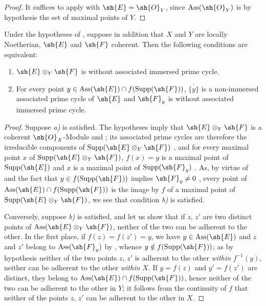 \begin{proof}
It suffices to apply  with $\sh{E}=\sh{O}_Y$, since $\operatorname{Ass}(\sh{O}_Y)$ is by hypothesis the set of maximal points of $Y$.
\end{proof}

\begin{corollary}[3.3.3]
\label{IV.3.3.3}
Under the hypotheses of , suppose in addition that $X$ and $Y$ are locally Noetherian, $\sh{E}$ and $\sh{F}$ coherent.
Then the following conditions are equivalent:
\begin{enumerate}[label=\emph{\alph*)}]
  \item $\sh{E}\otimes_Y\sh{F}$ is without associated immersed prime cycle.
  \item For every point $y\in\operatorname{Ass}(\sh{E})\cap f(\operatorname{Supp}(\sh{F}))$, $\overline{\{y\}}$ is a non-immersed associated prime cycle of $\sh{E}$ and $\sh{F}_y$ is without associated immersed prime cycle.
\end{enumerate}
\end{corollary}

\begin{proof}
Suppose \emph{a)} is satisfied.
The hypotheses imply that $\sh{E}\otimes_Y\sh{F}$ is a coherent $\sh{O}_X$-Module  and ; its associated prime cycles are therefore the irreducible components of $\operatorname{Supp}(\sh{E}\otimes_Y\sh{F})$ , and for every maximal point $x$ of $\operatorname{Supp}(\sh{E}\otimes_Y\sh{F})$, $f(x)=y$ is a maximal point of $\operatorname{Supp}(\sh{E})$ and $x$ is a maximal point of $\operatorname{Supp}(\sh{F}_y)$ .
As, by virtue of  and the fact that $y\in f(\operatorname{Supp}(\sh{F}))$ implies $\sh{F}_y\neq 0$ , every point of $\operatorname{Ass}(\sh{E})\cap f(\operatorname{Supp}(\sh{F}))$ is the image by $f$ of a maximal point of $\operatorname{Supp}(\sh{E}\otimes_Y\sh{F})$, we see that condition \emph{b)} is satisfied.

Conversely, suppose \emph{b)} is satisfied, and let us show that if $z$, $z'$ are two distinct points of $\operatorname{Ass}(\sh{E}\otimes_Y\sh{F})$, neither of the two can be adherent to the other.
In the first place, if $f(z)=f(z')=y$, we have $y\in\operatorname{Ass}(\sh{E})$ and $z$ and $z'$ belong to $\operatorname{Ass}(\sh{F}_y)$ by , whence $y\notin f(\operatorname{Supp}(\sh{F}))$; as by hypothesis neither of the two points $z$, $z'$ is adherent to the other \emph{within} $f^{-1}(y)$, neither can be adherent to the other \emph{within} $X$.
If $y=f(z)$ and $y'=f(z')$ are distinct, they belong to $\operatorname{Ass}(\sh{E})\cap f(\operatorname{Supp}(\sh{F}))$, hence neither of the two can be adherent to the other in $Y$; it follows from the continuity of $f$ that neither of the points $z$, $z'$ can be adherent to the other in $X$.
\end{proof}

